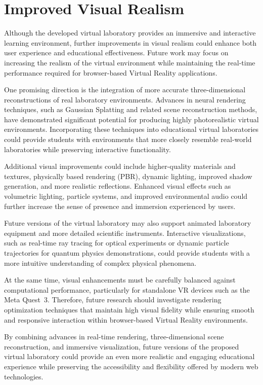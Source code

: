 \section{Improved Visual Realism}

Although the developed virtual laboratory provides an immersive and interactive learning environment, further improvements in visual realism could enhance both user experience and educational effectiveness. Future work may focus on increasing the realism of the virtual environment while maintaining the real-time performance required for browser-based Virtual Reality applications.

One promising direction is the integration of more accurate three-dimensional reconstructions of real laboratory environments. Advances in neural rendering techniques, such as Gaussian Splatting and related scene reconstruction methods, have demonstrated significant potential for producing highly photorealistic virtual environments. Incorporating these techniques into educational virtual laboratories could provide students with environments that more closely resemble real-world laboratories while preserving interactive functionality.

Additional visual improvements could include higher-quality materials and textures, physically based rendering (PBR), dynamic lighting, improved shadow generation, and more realistic reflections. Enhanced visual effects such as volumetric lighting, particle systems, and improved environmental audio could further increase the sense of presence and immersion experienced by users.

Future versions of the virtual laboratory may also support animated laboratory equipment and more detailed scientific instruments. Interactive visualizations, such as real-time ray tracing for optical experiments or dynamic particle trajectories for quantum physics demonstrations, could provide students with a more intuitive understanding of complex physical phenomena.

At the same time, visual enhancements must be carefully balanced against computational performance, particularly for standalone VR devices such as the Meta Quest~3. Therefore, future research should investigate rendering optimization techniques that maintain high visual fidelity while ensuring smooth and responsive interaction within browser-based Virtual Reality environments.

By combining advances in real-time rendering, three-dimensional scene reconstruction, and immersive visualization, future versions of the proposed virtual laboratory could provide an even more realistic and engaging educational experience while preserving the accessibility and flexibility offered by modern web technologies.

